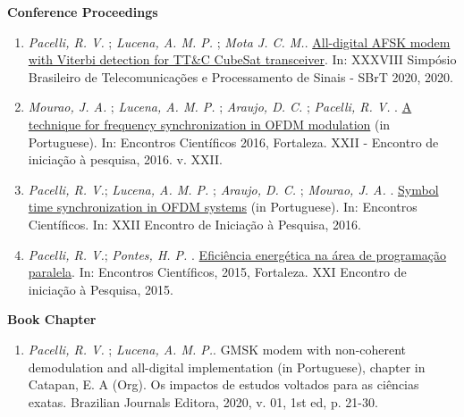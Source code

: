 \textbf{Conference Proceedings}
\begin{enumerate}[label=\textbf{C\arabic*.}, align=left, leftmargin=1.5cm]
    \item \textit{Pacelli, R. V.} ; \textit{Lucena, A. M. P.} ; \textit{Mota J. C. M.}. \href{http://www.sbrt.org.br/sbrt2020/papers/1570654898.pdf}{All-digital AFSK modem with Viterbi detection for TT\&C CubeSat transceiver}. In: XXXVIII Simpósio Brasileiro de Telecomunicações e Processamento de Sinais - SBrT 2020, 2020.
    \item \textit{Mourao, J. A.} ; \textit{Lucena, A. M. P.} ; \textit{Araujo, D. C.} ; \textit{Pacelli, R. V.} . \href{https://uol.unifor.br/oul/conteudosite/?cdConteudo=6946081}{A technique for frequency synchronization in OFDM modulation} (in Portuguese). In: Encontros Científicos 2016, Fortaleza. XXII - Encontro de iniciação à pesquisa, 2016. v. XXII.
    \item \textit{Pacelli, R. V.}; \textit{Lucena, A. M. P.} ; \textit{Araujo, D. C.} ; \textit{Mourao, J. A.} . \href{https://uol.unifor.br/oul/conteudosite/?cdConteudo=6949723}{Symbol time synchronization in OFDM systems} (in Portuguese). In: Encontros Científicos. In: XXII Encontro de Iniciação à Pesquisa, 2016.
    \item \textit{Pacelli, R. V.}; \textit{Pontes, H. P.} . \href{https://uol.unifor.br/oul/conteudosite/?cdConteudo=6111841}{Eficiência energética na área de programação paralela}. In: Encontros Científicos, 2015, Fortaleza. XXI Encontro de iniciação à Pesquisa, 2015.
\end{enumerate}

\textbf{Book Chapter}
\begin{enumerate}[label=\textbf{BC\arabic*.}, align=left, leftmargin=1.5cm]
    \item \textit{Pacelli, R. V.} ; \textit{Lucena, A. M. P.}. GMSK modem with non-coherent demodulation and all-digital implementation (in Portuguese), chapter in Catapan, E. A (Org). Os impactos de estudos voltados para as ciências exatas. Brazilian Journals Editora, 2020, v. 01, 1st ed, p. 21-30.
\end{enumerate}